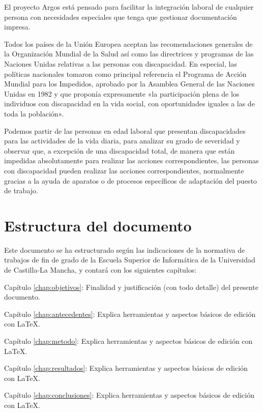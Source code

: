   El proyecto Argos está pensado para facilitar la integración laboral de cualquier persona con necesidades especiales que tenga que gestionar documentación impresa. 
  
  Todos los países de la Unión Europea aceptan las recomendaciones generales de la Organización Mundial de la Salud así como las directrices y programas de las Naciones Unidas relativas a las personas con discapacidad.  En especial, las políticas nacionales tomaron como principal referencia el Programa de Acción Mundial para los Impedidos, aprobado por la Asamblea General de las Naciones Unidas en 1982 y que proponía expresamente «la participación plena de los individuos con discapacidad en la vida social, con oportunidades iguales a las de toda la población». 

  Podemos partir de las personas en edad laboral que presentan discapacidades para las actividades de la vida diaria, para analizar su grado de severidad y observar que, a excepción de una discapacidad total, de manera que están impedidas absolutamente para realizar las acciones correspondientes, las personas con discapacidad pueden realizar las acciones correspondientes, normalmente gracias a la ayuda de aparatos o de procesos específicos de adaptación del puesto de trabajo.
  

 
  \section{Estructura del documento}

  Este documento se ha estructurado según las indicaciones de la normativa de trabajos de fin de grado de la Escuela Superior de Informática de la Universidad de Castilla-La Mancha, y contará con los siguientes capítulos:
  \begin{definitionlist}
  \item[Capítulo \ref{chap:objetivos}: \nameref{chap:objetivos}] Finalidad y justificación  (con todo detalle) del presente documento.
  \item[Capítulo \ref{chap:antecedentes}: \nameref{chap:antecedentes}] Explica herramientas y aspectos básicos de edición con \LaTeX.
  \item[Capítulo \ref{chap:metodo}: \nameref{chap:metodo}] Explica herramientas y aspectos básicos de edición con \LaTeX.
  \item[Capítulo \ref{chap:resultados}: \nameref{chap:resultados}] Explica herramientas y aspectos básicos de edición con \LaTeX.
  \item[Capítulo \ref{chap:conclusiones}: \nameref{chap:conclusiones}] Explica herramientas y aspectos básicos de edición con \LaTeX.
  \end{definitionlist}




